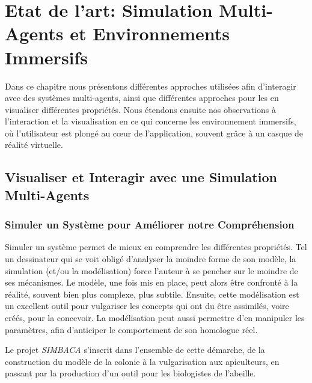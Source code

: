 \chapter{Etat de l'art: Simulation Multi-Agents et Environnements Immersifs}

	Dans ce chapitre nous présentons différentes approches utilisées afin d'interagir avec des systèmes multi-agents, ainsi que différentes approches pour les en visualiser différentes propriétés. Nous étendons ensuite nos observations à l'interaction et la visualisation en ce qui concerne les environnement immersifs, où l'utilisateur est plongé au cœur de l'application, souvent grâce à un casque de réalité virtuelle.

	\section{Visualiser et Interagir avec une Simulation Multi-Agents}
		\subsection{Simuler un Système pour Améliorer notre Compréhension}
		
		Simuler un système permet de mieux en comprendre les différentes propriétés. Tel un dessinateur qui se voit obligé d'analyser la moindre forme de son modèle, la simulation (et/ou la modélisation) force l'auteur à se pencher sur le moindre de ses mécanismes. Le modèle, une fois mis en place, peut alors être confronté à la réalité, souvent bien plus complexe, plus subtile. Ensuite, cette modélisation est un excellent outil pour vulgariser les concepts qui ont du être assimilés, voire créés, pour la concevoir. La modélisation peut aussi permettre d'en manipuler les paramètres, afin d'anticiper le comportement de son homologue réel.
		
	
	Le projet \textit{SIMBACA} s'inscrit dans l'ensemble de cette démarche, de la construction du modèle de la colonie à la vulgarisation aux apiculteurs, en passant par la production d'un outil pour les biologistes de l'abeille.
		
